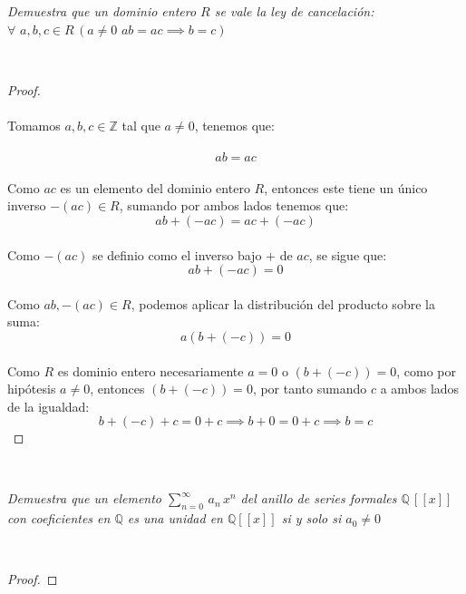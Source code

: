 \documentclass[11pt,letterpaper]{article}
\newcommand{\Z}{\mathbb{Z}}
\newcommand{\Q}{\mathbb{Q}}
\begin{document}
\begin{tcolorbox}[
	title = \textcolor{black}{\textcolor{white}{Problema 5}},]
\textit{Demuestra que un dominio entero $R$ se vale la ley de cancelaci\'on:\,\,$\forall\,\,a,b,c\in R\,(a\neq 0\,\,ab=ac \implies b=c)$
}
\end{tcolorbox}\,\\
\begin{proof}\,\\
    \,\\
    Tomamos  $a,b,c\in \Z$ tal que $a\neq 0$, tenemos que:\,\\
    \,\\
    \begin{equation*}
        ab=ac
    \end{equation*}\,\\
    Como $ac$ es un elemento del dominio entero $R$, entonces este tiene un \'unico inverso $-(ac)\in R$, sumando por ambos
    lados tenemos que:\,\\
    \begin{equation*}
        ab+(-ac)=ac+(-ac)
    \end{equation*}\,\\
    Como $-(ac)$ se definio como el inverso bajo $+$ de $ac$, se sigue que:\,\\
    \begin{equation*}
        ab+(-ac)=0
    \end{equation*}\,\\
    Como $ab,-(ac)\in R$, podemos aplicar la distribuci\'on del producto sobre la suma:\,\\
    \begin{equation*}
        a(b+(-c))=0
    \end{equation*}\,\\
    Como $R$ es dominio entero necesariamente $a=0$ o $(b+(-c))=0$, como por hip\'otesis $a\neq 0$, entonces
    $(b+(-c))=0$, por tanto sumando $c$ a ambos lados de la igualdad:\,\\
    \begin{equation*}
        b+(-c)+c=0+c\implies b+0=0+c\implies b=c
    \end{equation*}
\end{proof}\,\\
\begin{tcolorbox}[
	title = \textcolor{black}{\textcolor{white}{Problema 1}},]
\textit{Demuestra que un elemento $\displaystyle \sum_{n=0}^{\infty}\,a_n\,x^n$ del anillo de series formales $\Q\,[[x]]$
con coeficientes en $\Q$ es una unidad en $\Q[[x]]$ si y solo si $a_0\neq 0$
}
\end{tcolorbox}\,\\
\begin{proof}
    
\end{proof}\,\\
\end{document}
